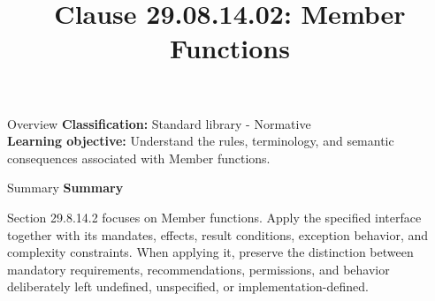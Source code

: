 \documentclass[10pt,letterpaper]{article}
\title{Clause 29.08.14.02: Member Functions}
\author{}
\date{}
\begin{document}
\maketitle
\begin{CornellOverviewBox}{Overview}
\textbf{Classification:} Standard library - Normative\\[2pt]
\textbf{Learning objective:} Understand the rules, terminology, and semantic consequences associated with Member functions.
\end{CornellOverviewBox}\begin{CornellSummaryBox}{Summary}
{\sffamily\bfseries\color{Accent} Summary}\par\vspace{3pt}Section 29.8.14.2 focuses on Member functions. Apply the specified interface together with its mandates, effects, result conditions, exception behavior, and complexity constraints. When applying it, preserve the distinction between mandatory requirements, recommendations, permissions, and behavior deliberately left undefined, unspecified, or implementation-defined.
\end{CornellSummaryBox}
\end{document}
